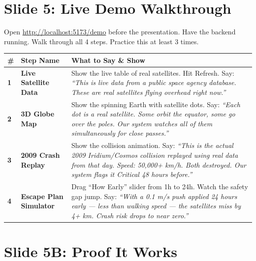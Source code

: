 \documentclass[11pt,a4paper]{article}
\begin{document}
\newpage
\section{Slide 5: Live Demo Walkthrough}

\begin{presenterbox}
Open \url{http://localhost:5173/demo} before the presentation. Have the backend running. Walk through all 4 steps. Practice this at least 3 times.
\end{presenterbox}

\begin{tcolorbox}[colback=lightgray, colframe=gray!30]
\renewcommand{\arraystretch}{1.3}
\begin{tabularx}{\linewidth}{@{}p{0.4cm}p{3.5cm}X@{}}
\toprule
\textbf{\#} & \textbf{Step Name} & \textbf{What to Say \& Show} \\
\midrule
\textbf{1} & \textbf{Live Satellite Data} &
  Show the live table of real satellites. Hit Refresh. Say: \textit{``This is live data from a public space agency database. These are real satellites flying overhead right now.''} \\[4pt]
\textbf{2} & \textbf{3D Globe Map} &
  Show the spinning Earth with satellite dots. Say: \textit{``Each dot is a real satellite. Some orbit the equator, some go over the poles. Our system watches all of them simultaneously for close passes.''} \\[4pt]
\textbf{3} & \textbf{2009 Crash Replay} &
  Show the collision animation. Say: \textit{``This is the actual 2009 Iridium/Cosmos collision replayed using real data from that day. Speed: 50,000+ km/h. Both destroyed. Our system flags it Critical 48 hours before.''} \\[4pt]
\textbf{4} & \textbf{Escape Plan Simulator} &
  Drag ``How Early'' slider from 1h to 24h. Watch the safety gap jump. Say: \textit{``With a 0.1 m/s push applied 24 hours early --- less than walking speed --- the satellites miss by 4+ km. Crash risk drops to near zero.''} \\
\bottomrule
\end{tabularx}
\end{tcolorbox}

\newpage
\section{Slide 5B: Proof It Works}
\end{document}
